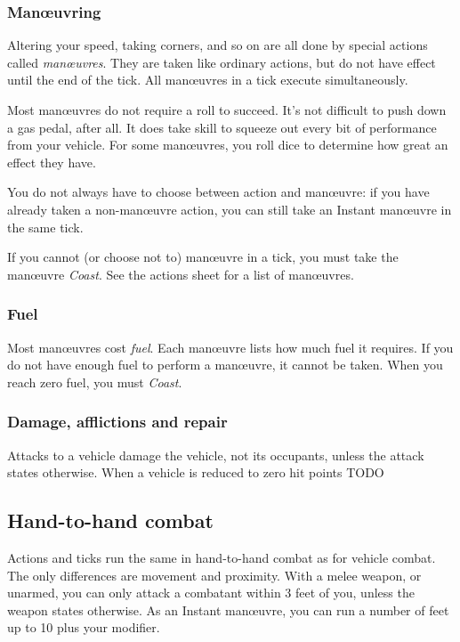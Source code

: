 \documentclass[10pt, a4paper, twocolumn]{article}
\begin{document}
\subsubsection{Man\oe{}uvring}
Altering your speed, taking corners, and so on are all done by special actions
called \emph{man\oe{}uvres}. They are taken like ordinary actions, but do not
have effect until the end of the tick. All man\oe{}uvres in a tick execute
simultaneously. 

Most man\oe{}uvres do not require a roll to succeed. It's not difficult to push
down a gas pedal, after all. It does take skill to squeeze out every bit of
performance from your vehicle. For some man\oe{}uvres, you roll dice to
determine how great an effect they have.

You do not always have to choose between action and man\oe{}uvre: if you have
already taken a non-man\oe{}uvre action, you can still take an Instant
man\oe{}uvre in the same tick.

If you cannot (or choose not to) man\oe{}uvre in a tick, you must take the
man\oe{}uvre \emph{Coast}. See the actions sheet for a list of man\oe{}uvres.

\subsubsection{Fuel}
Most man\oe{}uvres cost \emph{fuel}. Each man\oe{}uvre lists how much fuel it
requires. If you do not have enough fuel to perform a man\oe{}uvre, it cannot be
taken. When you reach zero fuel, you must \emph{Coast}.

\subsubsection{Damage, afflictions and repair}
Attacks to a vehicle damage the vehicle, not its occupants, unless the attack
states otherwise. When a vehicle is reduced to zero hit points TODO

\subsection{Hand-to-hand combat}
Actions and ticks run the same in hand-to-hand combat as for vehicle combat. The only
differences are movement and proximity. With a melee weapon, or unarmed, you can
only attack a combatant within 3 feet of you, unless the weapon states
otherwise. As an Instant man\oe{}uvre, you can run a number of feet up to 10
plus your  modifier. 
\end{document}
